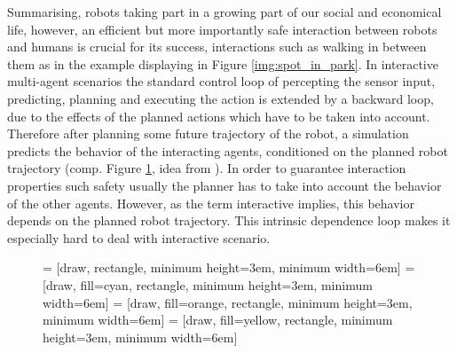 Summarising, robots taking part in a growing part of our social and economical life, however, an efficient but more importantly safe interaction between robots and humans is crucial for its success, interactions such as walking in between them as in the example displaying in Figure \ref{img:spot_in_park}.
\newline
In interactive multi-agent scenarios the standard control loop of percepting the sensor input, predicting, planning and executing the action \cite{Siegwart2011} is extended by a backward loop, due to the effects of the planned actions which have to be taken into account. Therefore after planning some future trajectory of the robot, a simulation predicts the behavior of the interacting agents, conditioned on the planned robot trajectory (comp. Figure \ref{fig:control_loop_interactive}, idea from \cite{Romanski2019}). In order to guarantee interaction properties such safety usually the planner has to take into account the behavior of the other agents. However, as the term interactive implies, this behavior depends on the planned robot trajectory. This intrinsic dependence loop makes it especially hard to deal with interactive scenario. 

\begin{figure}
\begin{center}
 = [draw, rectangle, minimum height=3em, minimum width=6em]
 = [draw, fill=cyan, rectangle, minimum height=3em, minimum width=6em]
 = [draw, fill=orange, rectangle, minimum height=3em, minimum width=6em]
 = [draw, fill=yellow, rectangle, minimum height=3em, minimum width=6em]
\label{fig:control_loop_interactive}
\end{center}
\end{figure}

